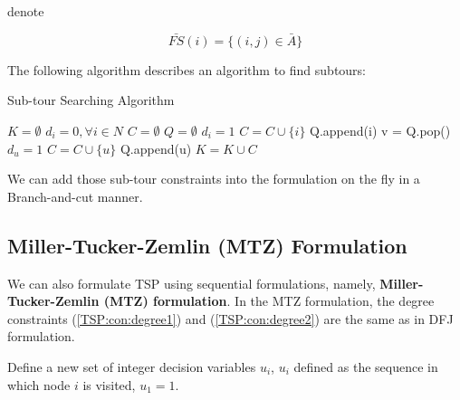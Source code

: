            denote
            
            \begin{equation*}
                \bar{FS}(i) = \{(i,j)\in \bar{A}\} 
            \end{equation*}

            The following algorithm describes an algorithm to find subtours:
            \begin{algorithm}[h!]
                \caption{Sub-tour Searching Algorithm}
                \begin{algorithmic}[1]
                    \State $K = \emptyset$
                    \State $d_i = 0, \forall i \in N$
                        \State $C = \emptyset$
                        \State $Q = \emptyset$
                            \State $d_i = 1$
                            \State $C = C\cup \{i\}$
                            \State Q.append(i)
                                \State v = Q.pop()
                                        \State $d_u = 1$
                                        \State $C = C \cup \{u\}$
                                        \State Q.append(u)
                                    \EndIf
                                \EndFor
                            \EndWhile
                        \EndIf
                        \State $K=K\cup C$
                    \EndFor
                \end{algorithmic}
            \end{algorithm}

            We can add those sub-tour constraints into the formulation on the fly in a Branch-and-cut manner.

        \subsection{Miller-Tucker-Zemlin (MTZ) Formulation}
            We can also formulate TSP using sequential formulations, namely, \textbf{Miller-Tucker-Zemlin (MTZ) formulation}. In the MTZ formulation, the degree constraints (\ref{TSP:con:degree1}) and (\ref{TSP:con:degree2}) are the same as in DFJ formulation.

            Define a new set of integer decision variables $u_i$, $u_i$ defined as the sequence in which node $i$ is visited, $u_1 = 1$.

